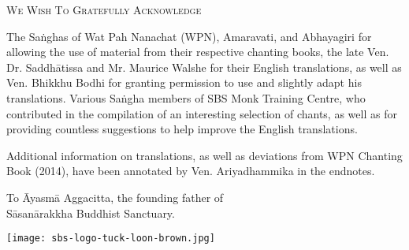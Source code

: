 \cleartorecto
\thispagestyle{empty}

{\setlength{\parskip}{10pt}

{\centering\fontsize{16}{25}\selectfont
\textsc{We Wish To Gratefully Acknowledge}
\par}

The Saṅghas of Wat Pah Nanachat (WPN), Amaravati, and Abhayagiri for allowing the use of material from their respective chanting books, the late Ven. Dr. Saddhātissa and Mr. Maurice Walshe for their English translations, as well as Ven. Bhikkhu Bodhi for granting permission to use and slightly adapt his translations. Various Saṅgha members of SBS Monk Training Centre, who contributed in the compilation of an interesting selection of chants, as well as for providing countless suggestions to help improve the English translations. 


Additional information on translations, as well as deviations\hyperlink{endnote1-appendix}{\hypertarget{endnote1-body}{}}
from WPN Chanting Book (2014), have been annotated by Ven. Ariyadhammika in the endnotes.

\medskip

{\centering
To Āyasmā Aggacitta, the founding father of\\
Sāsanārakkha Buddhist Sanctuary.

\medskip

\texttt{[image: sbs-logo-tuck-loon-brown.jpg]}

}

}
